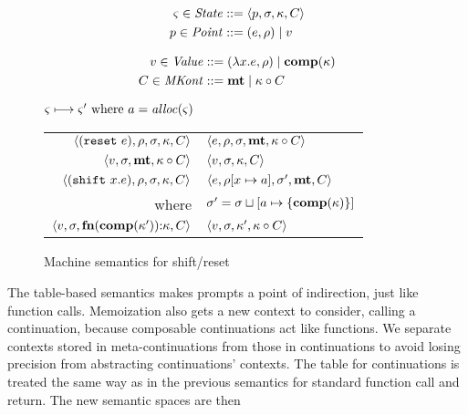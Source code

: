 \begin{center}
  \begin{minipage}{0.45\linewidth}
    \begin{align*}
      \varsigma \in \mathit{State} &::= \langle p, \sigma, \kappa, C \rangle \\
      p \in \mathit{Point} &::= (e, \rho) \mathrel{\mid} v
    \end{align*}
  \end{minipage}
  \begin{minipage}{0.50\linewidth}
    \begin{align*}
      v \in \mathit{Value} &::= (\lambda{} x. e, \rho) \mathrel{\mid} \mathbf{comp}(\kappa) \\
      C \in \mathit{MKont} &::= \mathbf{mt} \mathrel{\mid} \kappa\circ C
    \end{align*}
  \end{minipage}
\end{center}
\begin{figure}
  \centering
  $\varsigma \longmapsto \varsigma' \text{ where } a = \mathit{alloc}(\varsigma)$ \\
  \begin{tabular}{r|l}%
    \hline
    $\langle (\texttt{reset}\ e), \rho, \sigma, \kappa, C \rangle$
    &
    $\langle e, \rho, \sigma, \mathbf{mt}, \kappa\circ C \rangle$
    \\
    $\langle v, \sigma, \mathbf{mt}, \kappa\circ C \rangle$
    &
    $\langle v, \sigma, {\kappa}, {C} \rangle$
    \\
    $\langle (\texttt{shift}\ x. e), \rho, \sigma, \kappa, C \rangle$
    &
    $\langle e, \rho[x \mapsto a], \sigma',\mathbf{mt},C \rangle$
    \\ where & $\sigma' = \sigma\sqcup[a \mapsto \{ \mathbf{comp}(\kappa) \}]$
    \\
    $\langle v,\sigma,\mathbf{fn}{}(\mathbf{comp}(\kappa')){\tt :} \kappa, C \rangle$
    &
    $\langle v, \sigma, \kappa', \kappa\circ C \rangle$
  \end{tabular}  
  \caption{Machine semantics for shift/reset}
  \label{fig:shift-reset}
\end{figure}

The table-based semantics makes prompts a point of indirection, just like function calls.
%
Memoization also gets a new context to consider, calling a continuation, because composable continuations act like functions.
%
We separate contexts stored in meta-continuations from those in continuations to avoid losing precision from abstracting continuations' contexts.
%
The table for continuations is treated the same way as in the previous semantics for standard function call and return.
%
The new semantic spaces are then

